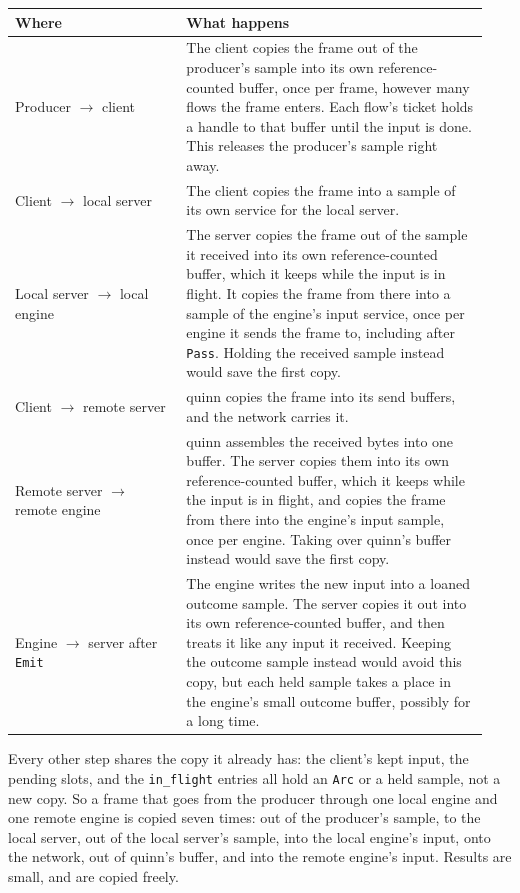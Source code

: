 \documentclass[11pt]{article}
\newcommand{\code}[1]{\texttt{#1}}
\begin{document}
\begin{center}
\small
\begin{tabular}{@{}p{0.34\linewidth}p{0.6\linewidth}@{}}
\toprule
Where & What happens \\
\midrule
Producer $\to$ client
  & The client copies the frame out of the producer's sample into its own
    reference-counted buffer, once per frame, however many flows the frame
    enters. Each flow's ticket holds a handle to that buffer until the input
    is done. This releases the producer's sample right away. \\
Client $\to$ local server
  & The client copies the frame into a sample of its own service for the local
    server. \\
Local server $\to$ local engine
  & The server copies the frame out of the sample it received into its own
    reference-counted buffer, which it keeps while the input is in flight.
    It copies the frame from there into a sample of the engine's input
    service, once per engine it sends the frame to, including after
    \code{Pass}. Holding the received sample instead would save the first
    copy. \\
Client $\to$ remote server
  & quinn copies the frame into its send buffers, and the network carries
    it. \\
Remote server $\to$ remote engine
  & quinn assembles the received bytes into one buffer. The server copies
    them into its own reference-counted buffer, which it keeps while the
    input is in flight, and copies the frame from there into the engine's
    input sample, once per engine. Taking over quinn's buffer instead would
    save the first copy. \\
Engine $\to$ server after \code{Emit}
  & The engine writes the new input into a loaned outcome sample. The server
    copies it out into its own reference-counted buffer, and then treats it
    like any input it received. Keeping the outcome sample instead would avoid
    this copy, but each held sample takes a place in the engine's small outcome
    buffer, possibly for a long time. \\
\bottomrule
\end{tabular}
\end{center}

Every other step shares the copy it already has: the client's kept input, the
pending slots, and the \code{in\_flight} entries all hold an \code{Arc} or a
held sample, not a new copy. So a frame that goes from the producer through
one local engine and one remote engine is copied seven times: out of the
producer's sample, to the local server, out of the local server's sample,
into the local engine's input, onto the network, out of quinn's buffer, and
into the remote engine's input. Results are small, and are copied freely.
\end{document}
